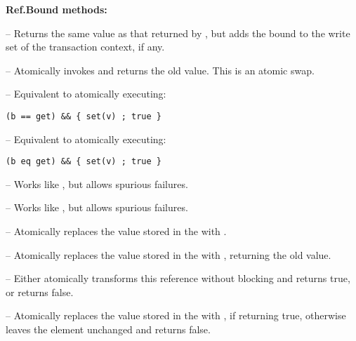 \textbf{Ref.Bound methods:}
\begin{packed_itemize}

\item {} -- Returns the same value as that returned
by , but adds the bound  to the write set of the
transaction context, if any.

\item {} -- Atomically invokes 
and returns the old value.  This is an atomic swap.

\item {} -- Equivalent to atomically executing:
\lstset{numbers=none}
\begin{lstlisting}
(b == get) && { set(v) ; true }
\end{lstlisting}

\item {} -- Equivalent 
to atomically executing: 
\lstset{numbers=none}
\begin{lstlisting}
(b eq get) && { set(v) ; true }
\end{lstlisting}

\item {} -- Works like , but allows spurious failures.

\item {} -- Works like 
, but allows spurious failures.

\item {} -- Atomically replaces the value  stored in the 
with .

\item {} -- Atomically replaces the value  stored in the 
with , returning the old value.

\item {} -- Either atomically transforms this reference without 
blocking and returns true, or returns false.

\item {} -- Atomically replaces 
the value  stored in the  with ,
if  returning true, otherwise leaves the element unchanged and returns false.

\end{packed_itemize}

